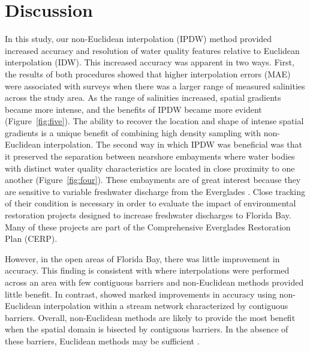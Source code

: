 \documentclass[shortnames,nofooter,noheadings]{jss}
\begin{document}
\section[Discussion]{Discussion}
\noindent In this study, our non-Euclidean interpolation (IPDW) method provided increased accuracy and resolution of water quality features relative to Euclidean interpolation (IDW). This increased accuracy was apparent in two ways. First, the results of both procedures showed that higher interpolation errors (MAE) were associated with surveys when there was a larger range of measured salinities across the study area. As the range of salinities increased, spatial gradients became more intense, and the benefits of IPDW became more evident (Figure~\ref{fig:five}). The ability to recover the location and shape of intense spatial gradients is a unique benefit of combining high density sampling with non-Euclidean interpolation.  The second way in which IPDW was beneficial was that it preserved the separation between nearshore embayments where water bodies with distinct water quality characteristics are located in close proximity to one another (Figure~\ref{fig:four}). These embayments are of great interest because they are sensitive to variable freshwater discharge from the Everglades \citep{nuttle2000influence}. Close tracking of their condition is necessary in order to evaluate the impact of environmental restoration projects designed to increase freshwater discharges to Florida Bay. Many of these projects are part of the Comprehensive Everglades Restoration Plan (CERP).

  However, in the open areas of Florida Bay, there was little improvement in accuracy. This finding is consistent with \cite{suominen2010surface} where interpolations were performed across an area with few contiguous barriers and non-Euclidean methods provided little benefit. In contrast, \cite{greenberg2011least} showed marked improvements in accuracy using non-Euclidean interpolation within a stream network characterized by contiguous barriers. Overall, non-Euclidean methods are likely to provide the most benefit when the spatial domain is bisected by contiguous barriers. In the absence of these barriers, Euclidean methods may be sufficient \citep{suominen2010surface,rivera2011salinity}. 
\end{document}
